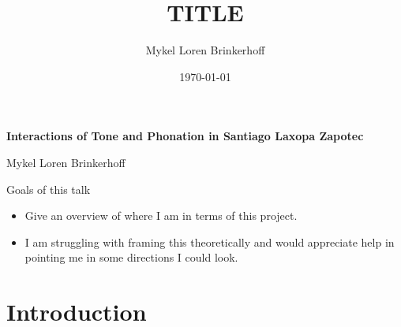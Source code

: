 \documentclass[12pt, letterpaper]{article}
\title{TITLE}
\author{Mykel Loren Brinkerhoff}
\date{\today}
\begin{document}
	
	
\begin{center}
	{\Large \textbf{Interactions of Tone and Phonation in Santiago Laxopa Zapotec}}
	\vspace{6pt}

	Mykel Loren Brinkerhoff
\end{center}
\thispagestyle{fancy}



\begin{tcolorbox}
\begin{center}
Goals of this talk
\end{center}

\begin{itemize}
	\item Give an overview of where I am in terms of this project. 
	\item I am struggling with framing this theoretically and would appreciate help in pointing me in some directions I could look.
\end{itemize}
\end{tcolorbox}

\section{Introduction} \label{sec:Introduction}
\end{document}
